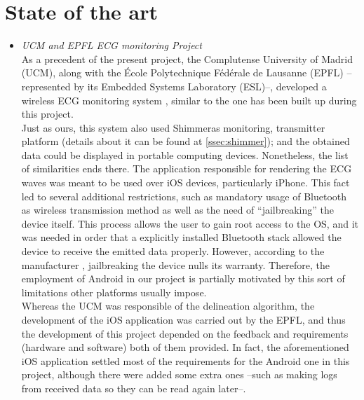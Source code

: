 	\section{State of the art}
	\label{sec:prj-sota}
		\begin{itemize}

			\item \emph{UCM and EPFL ECG monitoring Project}\\
				As a precedent of the present project, the Complutense University of Madrid (UCM), along with 
				the École Polytechnique Fédérale de Lausanne (EPFL) --represented by its Embedded Systems Laboratory
				(ESL)--, developed a wireless ECG monitoring system \cite{ESL}, similar to the one has been built 
				up during this project.\\

				Just as ours, this system also used Shimmer\texttrademark as monitoring, transmitter platform 
				(details about it can be found at \autoref{ssec:shimmer}); and the obtained data could be 
				displayed in portable computing devices.
				Nonetheless, the list of similarities ends there. The application responsible for rendering
				the ECG waves was meant to be used over iOS devices, particularly iPhone. This fact led to several
				additional restrictions, such as mandatory usage of Bluetooth as wireless transmission method as
				well as the need of ``jailbreaking'' the device itself. This process allows the user to gain root access to
				the OS, and it was needed in order that a explicitly installed Bluetooth stack allowed the device to 
				receive the emitted data properly. However, according to the manufacturer \cite{AppleJB}, jailbreaking 
				the device nulls its warranty. Therefore, the employment of Android in our project is partially motivated 
				by this sort of limitations other platforms usually impose.\\

				Whereas the UCM was responsible of the delineation algorithm, the development of the iOS application
				was carried out by the EPFL, and thus the development of this project depended on the feedback and requirements
				(hardware and software) both of them provided. In fact, the aforementioned iOS application settled most of the
				requirements for the Android one in this project, although there were added some extra ones --such as
				making logs from received data so they can be read again later--.\\
				

\end{itemize}
